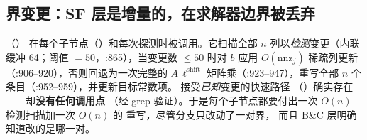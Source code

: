 \documentclass[11pt]{ctexart}
\newcommand{\nnz}{\mathrm{nnz}}
\begin{document}
\subsection{界变更：SF 层是增量的，在求解器边界被丢弃}
\label{sec:bound-updates}
（）
在每个子节点（）和每次探测时被调用。它扫描全部 $n$
列以\emph{检测}变更（内联缓冲 64；阈值
$=50$，:865），当变更数 $\le 50$ 时对 $b$
应用 $O(\nnz_j)$ 稀疏列更新（:906--920），否则回退为一次完整的
$A\,\ell^{\mathrm{shift}}$ 矩阵乘（:923--947），重写全部 $n$ 个
 条目（:952--959），并更新目标常数项。
接受\emph{已知}变更的快速路径
（）确实存在——却\textbf{没有任何调用点}
（经 grep 验证）。于是每个子节点都要付出一次 $O(n)$ 检测扫描加一次
$O(n)$ 的  重写，尽管分支只改动了一对界，
而且 B\&C 层明确知道改的是哪一对。
\end{document}
